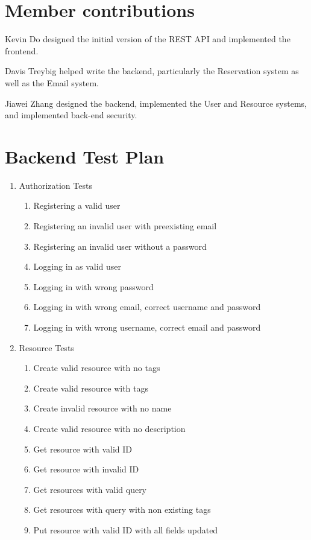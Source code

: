 \documentclass[12pt]{article}
\begin{document}
\section{Member contributions}
Kevin Do designed the initial version of the REST API and implemented the frontend.

Davis Treybig helped write the backend, particularly the Reservation system as well as the Email system. 

Jiawei Zhang designed the backend, implemented the User and Resource systems, and implemented back-end security. 

\clearpage
\appendix
\section{Backend Test Plan}
\label{appendix:backendtest}
\begin{enumerate}
	\item Authorization Tests
	\begin{enumerate}
		\item Registering a valid user
		\item Registering an invalid user with preexisting email
		\item Registering an invalid user without a password
		\item Logging in as valid user
		\item Logging in with wrong password
		\item Logging in with wrong email, correct username and password
		\item Logging in with wrong username, correct email and password
	\end{enumerate}
	\item Resource Tests
	\begin{enumerate}
		\item Create valid resource with no tags
		\item Create valid resource with tags
		\item Create invalid resource with no name
		\item Create valid resource with no description 
		\item Get resource with valid ID
		\item Get resource with invalid ID
		\item Get resources with valid query
		\item Get resources with query with non existing tags
		\item Put resource with valid ID with all fields updated

\end{enumerate}
\end{enumerate}
\end{document}
